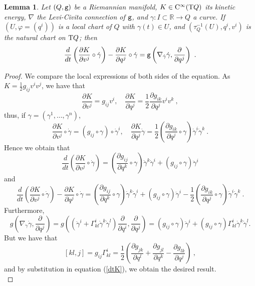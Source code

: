 \documentclass[12pt]{report}
\newtheorem{lem}[teor]{Lemma}
\def\beq{\begin{equation}}
\def\eeq{\end{equation}}
\def\derpar#1#2{\frac{\partial{#1}}{\partial{#2}}}
\def\qed{\ifvmode\removelastskip\fi
{\unskip\nobreak\hfil\penalty50\hbox{}\nobreak\hfil
\hbox{\vrule height1.2ex width1.2ex}\parfillskip=0pt
\finalhyphendemerits=0 \par\smallskip}}
\def\Real{\mathbb{R}}
\def\Tan{{\rm T}}
\def\Cinfty{{\rm C}^\infty}
\begin{document}
\begin{lem}
Let $(Q,{\tt g})$ be a Riemannian manifold, $K\in\Cinfty (\Tan Q)$ its kinetic energy, $\nabla$ the Levi-Civita connection of ${\tt g}$, and
$\gamma\colon I\subset\Real\to Q$ a curve.
If $(U,\varphi=(q^i))$ is a local chart of $Q$ with $\gamma(t)\in U$, and $(\tau_Q^{-1}(U),q^i,v^i)$
is the natural chart on $\Tan Q$; then
$$
\frac{d}{d t}\left(\derpar{K}{v^j}\circ\dot\gamma\right)-
\derpar{K}{q^j}\circ\dot\gamma=
{\tt g}\left(\nabla_{\dot\gamma}\dot\gamma,\derpar{}{q^j}\right) \ .
$$
\end{lem}
\begin{proof}
We compare the local expressions of both sides of the equation.
As $K=\frac{1}{2}g_{ij}v^iv^j$, we have that
$$
\derpar{K}{v^j}=g_{ij}v^i ,\quad
\derpar{K}{q^j}=\frac{1}{2}\derpar{g_{ik}}{q^j}v^iv^k \ ,
$$
thus, if $\gamma=(\gamma^1,\ldots ,\gamma^n)$,
$$
\derpar{K}{v^j}\circ\dot\gamma=(g_{ij}\circ\gamma)\circ\dot\gamma^i ,\quad
\derpar{K}{q^j}\dot\gamma=
\frac{1}{2}\left(\derpar{g_{ik}}{q^j}\circ\gamma\right)\dot\gamma^i\dot\gamma^k \ .
$$
Hence we obtain that
$$
\frac{d}{d t}\left(\derpar{K}{v^j}\circ\dot\gamma\right)=
\left(\derpar{g_{ij}}{q^k}\circ\gamma\right)\dot\gamma^k\dot\gamma^i+
(g_{ij}\circ\gamma)\ddot\gamma^i
$$
and
\beq
\frac{d}{d t}\left(\derpar{K}{v^j}\circ\dot\gamma\right)-
\derpar{K}{q^j}\circ\dot\gamma=
\left(\derpar{g_{ij}}{q^k}\circ\gamma\right)\dot\gamma^k\dot\gamma^i+
(g_{ij}\circ\gamma)\ddot\gamma^i-
\frac{1}{2}\left(\derpar{g_{ik}}{q^j}\circ\gamma\right)\dot\gamma^i\dot\gamma^k \ . \label{dtK}
\eeq
Furthermore,
$$
g\left(\nabla_{\dot\gamma}\dot\gamma,\derpar{}{q^j}\right)=
g\left((\ddot\gamma^{i}+\Gamma^i_{kl}\dot\gamma^k\dot\gamma^l)\derpar{}{q^i},\derpar{}{q^j}\right)=
(g_{ij}\circ\gamma)\ddot\gamma^i+
(g_{ij}\circ\gamma)\Gamma^i_{kl}\dot\gamma^k\dot\gamma^l.
$$
But we have that
$$
[kl,j]=g_{ij}\Gamma^i_{kl}=
\frac{1}{2}\left(\derpar{g_{jk}}{q^l}+\derpar{g_{jl}}{q^k}-\derpar{g_{lk}}{q^j}\right) \ ,
$$
and by substitution in equation (\ref{dtK}), we obtain the desired result.
\\ \qed \end{proof}
\end{document}
